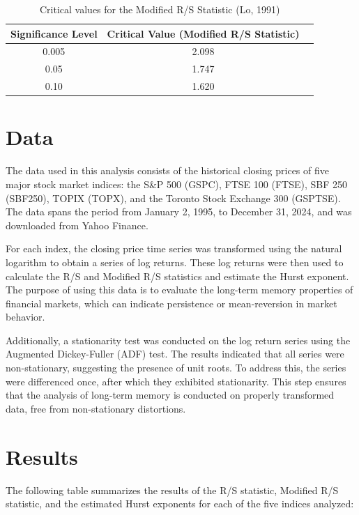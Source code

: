 \documentclass[11pt]{extarticle}
\begin{document}
\begin{table}[ht!]
\centering
\begin{tabular}{|c|c|c|}
\hline
\textbf{Significance Level} & \textbf{Critical Value (Modified R/S Statistic)} \\
\hline
0.005 & 2.098\\
0.05 & 1.747\\
0.10 & 1.620\\

\hline
\end{tabular}
\caption{Critical values for the Modified R/S Statistic (Lo, 1991)}
\end{table}



\section{Data}

The data used in this analysis consists of the historical closing prices of five major stock market indices: the S\&P 500 (GSPC), FTSE 100 (FTSE), SBF 250 (SBF250), TOPIX (TOPX), and the Toronto Stock Exchange 300 (GSPTSE).
The data spans the period from January 2, 1995, to December 31, 2024, and was downloaded from Yahoo Finance.

For each index, the closing price time series was transformed using the natural logarithm to obtain a series of log returns.
These log returns were then used to calculate the R/S and Modified R/S statistics and estimate the Hurst exponent.
The purpose of using this data is to evaluate the long-term memory properties of financial markets, which can indicate persistence or mean-reversion in market behavior.

Additionally, a stationarity test was conducted on the log return series using the Augmented Dickey-Fuller (ADF) test.
The results indicated that all series were non-stationary, suggesting the presence of unit roots. To address this, the series were differenced once, after which they exhibited stationarity.
This step ensures that the analysis of long-term memory is conducted on properly transformed data, free from non-stationary distortions.

\section{Results}


The following table summarizes the results of the R/S statistic, Modified R/S statistic, and the estimated Hurst exponents for each of the five indices analyzed: \\
\end{document}
